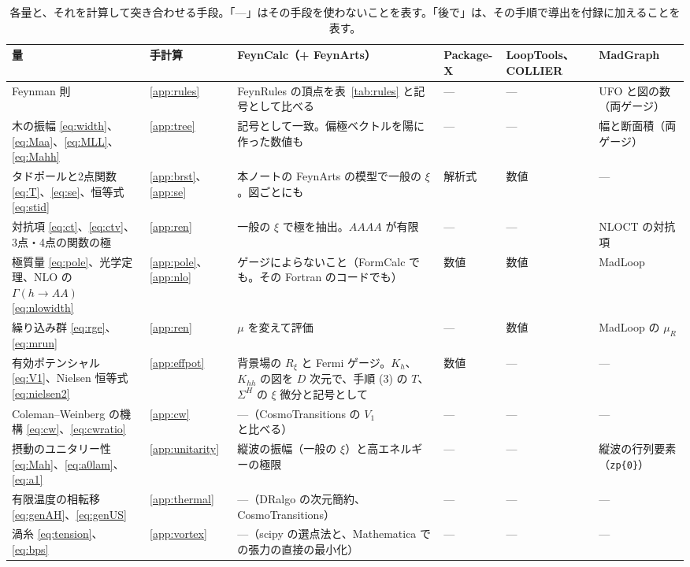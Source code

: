 \documentclass[a4paper,10pt]{ltjsarticle}
\begin{document}
\begin{table}[tbp]
\centering\small
\caption{各量と、それを計算して突き合わせる手段。「—」はその手段を使わないことを表す。「後で」は、その手順で導出を付録に加えることを表す。}
\label{tab:plan}
\begin{tabularx}{\linewidth}{>{\raggedright\arraybackslash}p{3.5cm}>{\raggedright\arraybackslash}p{1.3cm}>{\raggedright\arraybackslash}X>{\raggedright\arraybackslash}p{1.75cm}>{\raggedright\arraybackslash}p{1.75cm}>{\raggedright\arraybackslash}p{2.0cm}}
\toprule
\textbf{量} & \textbf{手計算} & \textbf{FeynCalc（+ FeynArts）} & \textbf{Package-X} & \textbf{LoopTools、COLLIER} & \textbf{MadGraph} \\
\midrule
Feynman 則 & \ref{app:rules} & FeynRules の頂点を表~\ref{tab:rules} と記号として比べる & — & — & UFO と図の数（両ゲージ） \\
木の振幅 \eqref{eq:width}、\eqref{eq:Maa}、\eqref{eq:MLL}、\eqref{eq:Mahh} & \ref{app:tree} & 記号として一致。偏極ベクトルを陽に作った数値も & — & — & 幅と断面積（両ゲージ） \\
タドポールと2点関数 \eqref{eq:T}、\eqref{eq:se}、恒等式 \eqref{eq:stid} & \ref{app:brst}、\ref{app:se} & 本ノートの FeynArts の模型で一般の $\xi$。図ごとにも & 解析式 & 数値 & — \\
対抗項 \eqref{eq:ct}、\eqref{eq:ctv}、3点・4点の関数の極 & \ref{app:ren} & 一般の $\xi$ で極を抽出。$AAAA$ が有限 & — & — & NLOCT の対抗項 \\
極質量 \eqref{eq:pole}、光学定理、NLO の $\Gamma(h\to AA)$ \eqref{eq:nlowidth} & \ref{app:pole}、\ref{app:nlo} & ゲージによらないこと（FormCalc でも。その Fortran のコードでも） & 数値 & 数値 & MadLoop \\
繰り込み群 \eqref{eq:rge}、\eqref{eq:mrun} & \ref{app:ren} & $\mu$ を変えて評価 & — & 数値 & MadLoop の $\mu_R$ \\
有効ポテンシャル \eqref{eq:V1}、Nielsen 恒等式 \eqref{eq:nielsen2} & \ref{app:effpot} & 背景場の $R_\xi$ と Fermi ゲージ。$K_h$、$K_{hh}$ の図を $D$ 次元で、手順 (3) の $T$、$\Sigma^H$ の $\xi$ 微分と記号として & 数値 & — & — \\
Coleman--Weinberg の機構 \eqref{eq:cw}、\eqref{eq:cwratio} & \ref{app:cw} & —（CosmoTransitions の $V_1$ と比べる） & — & — & — \\
摂動のユニタリー性 \eqref{eq:Mah}、\eqref{eq:a0lam}、\eqref{eq:a1} & \ref{app:unitarity} & 縦波の振幅（一般の $\xi$）と高エネルギーの極限 & — & — & 縦波の行列要素（\texttt{zp\{0\}}） \\
有限温度の相転移 \eqref{eq:genAH}、\eqref{eq:genUS} & \ref{app:thermal} & —（DRalgo の次元簡約、CosmoTransitions） & — & — & — \\
渦糸 \eqref{eq:tension}、\eqref{eq:bps} & \ref{app:vortex} & —（scipy の選点法と、Mathematica での張力の直接の最小化） & — & — & — \\
\bottomrule
\end{tabularx}
\end{table}
\end{document}
